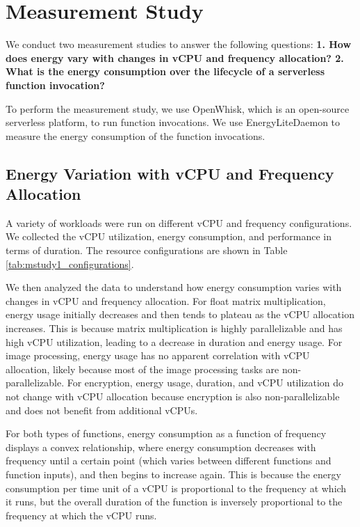 \documentclass[times, 10pt,twocolumn]{article}
\begin{document}
\section{Measurement Study}

We conduct two measurement studies to answer the following questions: \textbf{1. How does energy vary with changes in vCPU and frequency allocation? 2. What is the energy consumption over the lifecycle of a serverless function invocation?}

To perform the measurement study, we use OpenWhisk, which is an open-source serverless platform, to run function invocations. We use EnergyLiteDaemon to measure the energy consumption of the function invocations.

\subsection{Energy Variation with vCPU and Frequency Allocation}

A variety of workloads were run on different vCPU and frequency configurations. We collected the vCPU utilization, energy consumption, and performance in terms of duration. The resource configurations are shown in Table \ref{tab:mstudy1_configurations}.

We then analyzed the data to understand how energy consumption varies with changes in vCPU and frequency allocation. For float matrix multiplication, energy usage initially decreases and then tends to plateau as the vCPU allocation increases. This is because matrix multiplication is highly parallelizable and has high vCPU utilization, leading to a decrease in duration and energy usage. For image processing, energy usage has no apparent correlation with vCPU allocation, likely because most of the image processing tasks are non-parallelizable. For encryption, energy usage, duration, and vCPU utilization do not change with vCPU allocation because encryption is also non-parallelizable and does not benefit from additional vCPUs.

For both types of functions, energy consumption as a function of frequency displays a convex relationship, where energy consumption decreases with frequency until a certain point (which varies between different functions and function inputs), and then begins to increase again. This is because the energy consumption per time unit of a vCPU is proportional to the frequency at which it runs, but the overall duration of the function is inversely proportional to the frequency at which the vCPU runs. 
\end{document}
